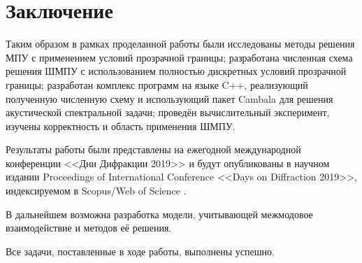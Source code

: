 \documentclass{fefu}
\begin{document}
    \section{Заключение}
        \par Таким образом в рамках проделанной работы были исследованы методы решения МПУ с применением условий прозрачной границы; разработана численная схема решения ШМПУ с использованием полностью дискретных условий прозрачной границы; разработан комплекс программ на языке C++, реализующий полученную численную схему и использующий пакет Cambala для решения акустической спектральной задачи; проведён вычислительный эксперимент, изучены корректность и область применения ШМПУ.
        \par Результаты работы были представлены на ежегодной международной конференции <<Дни Дифракции 2019>> \cite{dda} и будут опубликованы в научном издании Proceedings of International Conference <<Days on Diffraction 2019>>, индексируемом в Scopus/Web of Science \cite{dd}.
        \par В дальнейшем возможна разработка модели, учитывающей межмодовое взаимодействие и методов её решения.
        \par Все задачи, поставленные в ходе работы, выполнены успешно.
    \newpage
    
    	
    \glsaddall	
\end{document}
